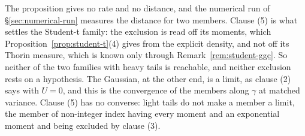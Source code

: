 The proposition gives no rate and no distance, and the numerical run of
\S\ref{sec:numerical-run} measures the distance for two members. Clause (5) is what settles the
Student-t family: the exclusion is read off its moments, which
Proposition~\ref{prop:student-t}(4) gives from the explicit density, and not off its Thorin
measure, which is known only through Remark~\ref{rem:student-ggc}. So neither of the two families
with heavy tails is reachable, and neither exclusion rests on a hypothesis. The Gaussian, at the
other end, is a limit, as clause (2) says with $U = 0$, and this is the convergence of the
\Matern{} members along $\gamma$ at matched variance. Clause (5) has no converse: light tails do
not make a member a limit, the \Matern{} member of non-integer index having every moment and an
exponential moment and being excluded by clause (3).

